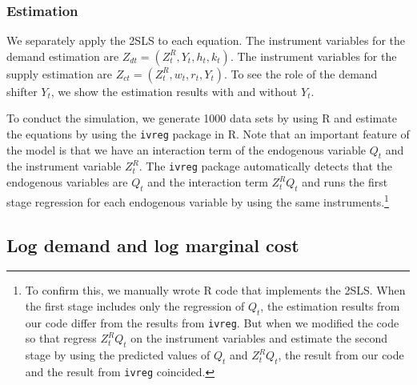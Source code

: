\documentclass[11pt, a4paper]{article}
\begin{document}
\subsubsection{Estimation}

We separately apply the 2SLS to each equation.
The instrument variables for the demand estimation are $Z_{dt} = (Z^R_t, Y_t, h_t, k_t)$.
The instrument variables for the supply estimation are $Z_{ct} = (Z^R_t, w_t, r_t, Y_t)$. 
To see the role of the demand shifter $Y_t$, we show the estimation results with and without $Y_t$.

To conduct the simulation, we generate 1000 data sets by using R and estimate the equations by using the \texttt{ivreg} package in R.
Note that an important feature of the model is that we have an interaction term of the endogenous variable $Q_t$ and the instrument variable $Z^R_t$.
The \texttt{ivreg} package automatically detects that the endogenous variables are $Q_t$ and the interaction term $Z^R_tQ_t$ and runs the first stage regression for each endogenous variable by using the same instruments.\footnote{To confirm this, we manually wrote R code that implements the 2SLS. When the first stage includes only the regression of $Q_t$, the estimation results from our code differ from the results from \texttt{ivreg}. But when we modified the code so that regress $Z^R_tQ_t$ on the instrument variables and estimate the second stage by using the predicted values of $Q_t$ and $Z^R_tQ_t$, the result from our code and the result from \texttt{ivreg} coincided.}


\subsection{Log demand and log marginal cost}
\end{document}
